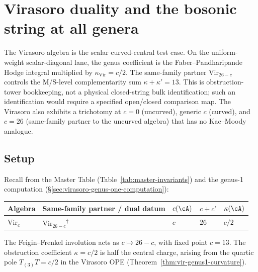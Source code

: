 \section{Virasoro duality and the bosonic string at all genera}\label{sec:virasoro-all-genera}

The Virasoro algebra is the scalar curved-central test case. On the
uniform-weight scalar-diagonal lane, the genus coefficient is the
Faber--Pandharipande Hodge integral multiplied by
$\kappa_{\mathrm{Vir}}=c/2$. The same-family partner
$\mathrm{Vir}_{26-c}$ controls the M/S-level complementarity sum
$\kappa+\kappa'=13$. This is obstruction-tower bookkeeping, not a
physical closed-string bulk identification; such an identification
would require a specified open/closed comparison map. The Virasoro
also exhibits a trichotomy at $c = 0$ (uncurved), generic $c$ (curved),
and $c = 26$ (same-family partner to the uncurved algebra) that has no
Kac--Moody analogue.

\subsection{Setup}\label{subsec:vir-genus-setup}

Recall from the Master Table (Table~\ref{tab:master-invariants}) and the genus-1 computation (\S\ref{sec:virasoro-genus-one-computation}):

\begin{center}
\renewcommand{\arraystretch}{1.4}
\begin{tabular}{lllll}
\toprule
Algebra & Same-family partner / dual datum & $c(\cA)$ & $c + c'$ & $\kappa(\cA)$ \\
\midrule
$\mathrm{Vir}_c$ & $\mathrm{Vir}_{26-c}$\textsuperscript{$\dagger$} & $c$ & $26$ & $c/2$ \\[4pt]
\bottomrule
\end{tabular}
\end{center}
The Feigin--Frenkel involution acts as $c \mapsto 26 - c$, with fixed
point $c = 13$. The obstruction coefficient $\kappa = c/2$ is half
the central charge, arising from the quartic pole $T_{(3)}T = c/2$ in
the Virasoro OPE (Theorem~\ref{thm:vir-genus1-curvature}).

